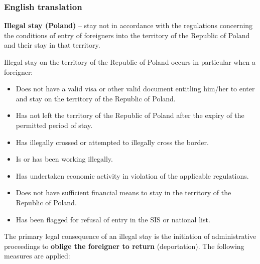 \subsubsection{English translation}\label{english-translation}

\textbf{Illegal stay (Poland)} -- stay not in accordance with the
regulations concerning the conditions of entry of foreigners into the
territory of the Republic of Poland and their stay in that territory.

Illegal stay on the territory of the Republic of Poland occurs in
particular when a foreigner:

\begin{itemize}
\tightlist
\item
  Does not have a valid visa or other valid document entitling him/her
  to enter and stay on the territory of the Republic of Poland.
\item
  Has not left the territory of the Republic of Poland after the expiry
  of the permitted period of stay.
\item
  Has illegally crossed or attempted to illegally cross the border.
\item
  Is or has been working illegally.
\item
  Has undertaken economic activity in violation of the applicable
  regulations.
\item
  Does not have sufficient financial means to stay in the territory of
  the Republic of Poland.
\item
  Has been flagged for refusal of entry in the SIS or national list.
\end{itemize}

The primary legal consequence of an illegal stay is the initiation of
administrative proceedings to \textbf{oblige the foreigner to return}
(deportation). The following measures are applied:

